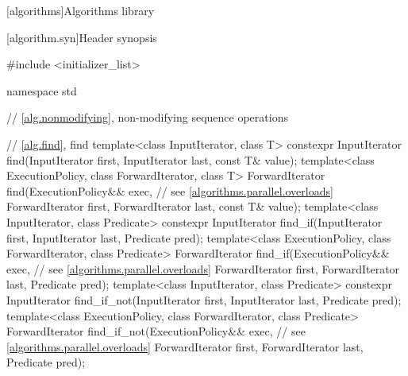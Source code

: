 \setcounter{chapter}{24}
\setcounter{section}{5}
\setcounter{subsection}{1}
\setcounter{subsubsection}{1}

[algorithms]{Algorithms library}

\setcounter{section}{3}

[algorithm.syn]{Header  synopsis}
%

\begin{codeblock}
#include <initializer_list>

namespace std {
  // \ref{alg.nonmodifying}, non-modifying sequence operations

  // \ref{alg.find}, find
  template<class InputIterator, class T>
    constexpr InputIterator find(InputIterator first, InputIterator last,
                                 const T& value);
  template<class ExecutionPolicy, class ForwardIterator, class T>
    ForwardIterator find(ExecutionPolicy&& exec, // see \ref{algorithms.parallel.overloads}
                         ForwardIterator first, ForwardIterator last,
                         const T& value);
  template<class InputIterator, class Predicate>
    constexpr InputIterator find_if(InputIterator first, InputIterator last,
                                    Predicate pred);
  template<class ExecutionPolicy, class ForwardIterator, class Predicate>
    ForwardIterator find_if(ExecutionPolicy&& exec, // see \ref{algorithms.parallel.overloads}
                            ForwardIterator first, ForwardIterator last,
                            Predicate pred);
  template<class InputIterator, class Predicate>
    constexpr InputIterator find_if_not(InputIterator first, InputIterator last,
                                        Predicate pred);
  template<class ExecutionPolicy, class ForwardIterator, class Predicate>
    ForwardIterator find_if_not(ExecutionPolicy&& exec, // see \ref{algorithms.parallel.overloads}
                                ForwardIterator first, ForwardIterator last,
                                Predicate pred);

}
\end{codeblock}
